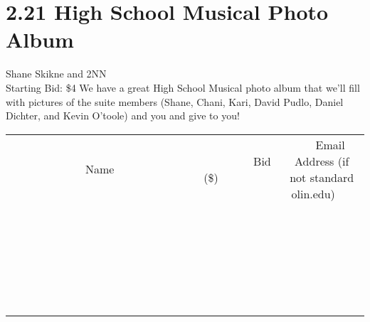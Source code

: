 \documentclass[11pt]{article}
\begin{document}
\section*{2.21 High School Musical Photo Album}
Shane Skikne and 2NN
\\
Starting Bid: \$4
\newline
We have a great High School Musical photo album that we'll fill with pictures of the suite members (Shane, Chani, Kari, David Pudlo, Daniel Dichter, and Kevin O'toole) and you and give to you!
\\[6ex]
\begin{tabular}{c c c}
~~~~~~~~~~~~~Name~~~~~~~~~~~~~ & ~~~~~~~~~Bid (\$)~~~~~~~~~  & ~~~Email Address (if not standard olin.edu)~~~\\
 & & \\
\hline
 & & \\
\hline
 & & \\
\hline
 & & \\
\hline
 & & \\
\hline
 & & \\
\hline
 & & \\
\hline
 & & \\
\hline
 & & \\
\hline
 & & \\
\hline
 & & \\
\hline
 & & \\
\hline
 & & \\
\hline
 & & \\
\hline
 & & \\
\hline
 & & \\
\hline
 & & \\
\hline
 & & \\
\hline
 & & \\
\hline
 & & \\
\hline
 & & \\
\hline
 & & \\
\hline
 & & \\
\hline
 & & \\
\hline
 & & \\
\hline
 & & \\
\hline
\end{tabular}
\newpage
\end{document}

